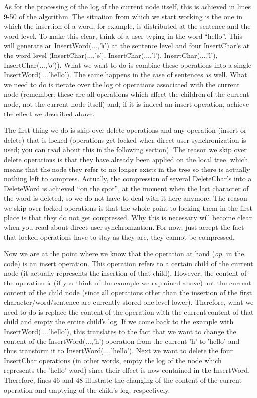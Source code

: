As for the processing of the log of the current node itself, this is achieved in lines 9-50 of the
algorithm. The situation from which we start working is the one in which the insertion of a word,
for example, is distributed at the sentence and the word level. To make this clear, think of a user
typing in the word ``hello''. This will generate an InsertWord(...,'h') at the sentence level and
four InsertChar's at the word level (InsertChar(...,'e'), InsertChar(...,'l'), InsertChar(...,'l'),
InsertChar(...,'o')). What we want to do is combine these operations into a single InsertWord(...,'hello').
The same happens in the case of sentences as well. What we need to do is iterate over the log of
operations associated with the current node (remember: these are all operations which affect the
children of the current node, not the current node itself) and, if it is indeed an insert operation,
achieve the effect we described above.

The first thing we do is skip over delete operations and any operation (insert or delete) that is
locked (operations get locked when direct user synchronization is used; you can read about this
in the following section). The reason we skip over delete operations is that they have already
been applied on the local tree, which means that the node they refer to no longer exists in the
tree so there is actually nothing left to compress. Actually, the compression of several DeleteChar's
into a DeleteWord is achieved ``on the spot'', at the moment when the last character of the word
is deleted, so we do not have to deal with it here anymore. The reason we skip over locked operations
is that the whole point to locking them in the first place is that they do not get compressed. Why
this is necessary will become clear when you read about direct user synchronization. For now, just
accept the fact that locked operations have to stay as they are, they cannot be compressed.

Now we are at the point where we know that the operation at hand (\emph{op}, in the code) is an insert
operation. This operation refers to a certain child of the current node (it actually represents the
insertion of that child). However, the content of the operation is (if you think of the example
we explained above) not the current content of the child node (since all operations other than the
insertion of the first character/word/sentence are currently stored one level lower). Therefore, what
we need to do is replace the content of the operation with the current content of that child and
empty the entire child's log. If we come back to the example with InsertWord(...,'hello'), this
translates to the fact that we want to change the content of the InsertWord(...,'h') operation from
the current 'h' to 'hello' and thus transform it to InsertWord(...,'hello'). Next we want to
delete the four InsertChar operations (in other words, empty the log of the node which represents the 'hello'
word) since their effect is now contained in the InsertWord. Therefore, lines 46 and 48
illustrate the changing of the content of the current operation and emptying of the child's
log, respectively.

